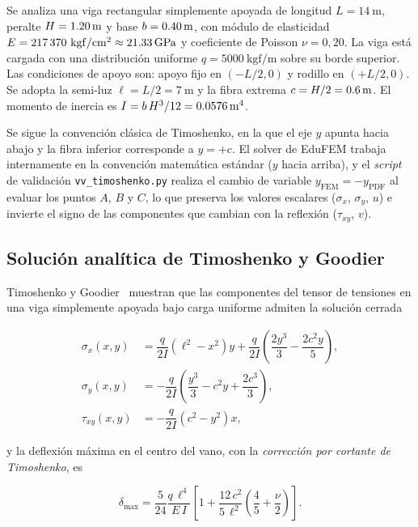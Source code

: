 Se analiza una viga rectangular simplemente apoyada de longitud
$L = \SI{14}{\meter}$, peralte $H = \SI{1{,}20}{\meter}$ y base
$b = \SI{0{,}40}{\meter}$, con módulo de elasticidad
$E = 217\,370~\mathrm{kgf/cm^2} \approx \SI{21{,}33}{\giga\pascal}$
y coeficiente de Poisson $\nu = 0{,}20$. La viga está cargada con una
distribución uniforme $q = 5000~\mathrm{kgf/m}$ sobre su borde superior.
Las condiciones de apoyo son: apoyo fijo en $(-L/2, 0)$ y rodillo en
$(+L/2, 0)$. Se adopta la semi-luz $\ell = L/2 = \SI{7}{\meter}$ y la fibra
extrema $c = H/2 = \SI{0{,}6}{\meter}$. El momento de inercia es
$I = b\,H^3 / 12 = \SI{0{,}0576}{\meter\tothe{4}}$.

Se sigue la convención clásica de Timoshenko, en la que el eje $y$ apunta
hacia abajo y la fibra inferior corresponde a $y = +c$. El solver de
EduFEM trabaja internamente en la convención matemática estándar
($y$ hacia arriba), y el \emph{script} de validación
\verb|vv_timoshenko.py| realiza el cambio de variable
$y_{\mathrm{FEM}} = -y_{\mathrm{PDF}}$ al evaluar los puntos $A$, $B$ y
$C$, lo que preserva los valores escalares ($\sigma_x$, $\sigma_y$, $u$)
e invierte el signo de las componentes que cambian con la reflexión
($\tau_{xy}$, $v$).

\subsection{Solución analítica de Timoshenko y Goodier}

Timoshenko y Goodier~\cite{timoshenko1970theory} muestran que las componentes
del tensor de tensiones en una viga simplemente apoyada bajo carga uniforme
admiten la solución cerrada

\begin{align}
  \sigma_x(x,y) &= \dfrac{q}{2I}\left(\ell^2 - x^2\right) y
                  + \dfrac{q}{2I}\left(\dfrac{2y^3}{3} - \dfrac{2c^2 y}{5}\right),
                  \label{eq:tim_sx}\\
  \sigma_y(x,y) &= -\dfrac{q}{2I}\left(\dfrac{y^3}{3} - c^2 y + \dfrac{2c^3}{3}\right),
                  \label{eq:tim_sy}\\
  \tau_{xy}(x,y) &= -\dfrac{q}{2I}\left(c^2 - y^2\right) x,
                  \label{eq:tim_txy}
\end{align}

\noindent y la deflexión máxima en el centro del vano, con la
\emph{corrección por cortante de Timoshenko}, es

\begin{equation}
  \delta_{\max} = \dfrac{5}{24}\dfrac{q\,\ell^4}{E\,I}
                  \left[1 + \dfrac{12\,c^2}{5\,\ell^2}\left(\dfrac{4}{5} + \dfrac{\nu}{2}\right)\right].
  \label{eq:tim_delta}
\end{equation}

